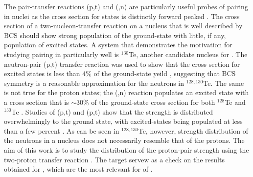 The pair-transfer reactions (p,t) and (,n) are particularly useful probes of pairing in nuclei as the cross section for \zp states is distinctly forward peaked \citep{Yoshida}.  The cross section of a two-nucleon-transfer reaction on a nucleus that is well described by BCS should show strong population of the \zp ground-state with little, if any, population of \zp excited states.  A system that demonstrates the motivation for studying pairing in  particularly well is $^{130}$Te, another candidate nucleus for \zvbb.  The neutron-pair (p,t) transfer reaction was used to show that the cross section for excited \zp states is less than 4\% of the ground-state yeild \citep{neutronPairsTellurium}, suggesting that BCS symmetry is a reasonable approximation for the neutrons in $^{128,130}$Te.  The same is not true for the proton states; the (,n) reaction populates an excited \zp state with a cross section that is $\sim$30\% of the ground-state cross section for both $^{128}$Te and $^{130}$Te \citep{protonPairsTellurium}.  Studies of (p,t) and (p,t) show that the \zp strength is distributed overwhelmingly to the ground state, with excited-\zp states being populated at less than a few percent \citep{neutronPairsGermanium}.  As can be seen in $^{128,130}$Te, however, \zp strength distribution of the neutrons in a nucleus does not necessarily resemble that of the protons.  The aim of this work is to study the distribution of the proton-pair strength using the two-proton transfer reaction \reaction.  The  target servew as a check on the results obtained for , which are the most relevant for \zvbb of .  

